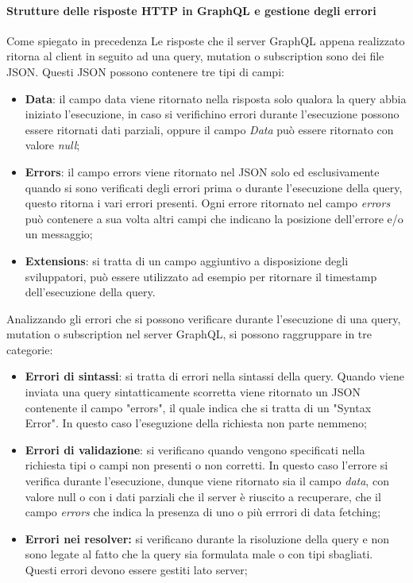 \paragraph{Strutture delle risposte HTTP in GraphQL e gestione degli errori}
Come spiegato in precedenza
Le risposte che il server GraphQL appena realizzato ritorna al client in seguito ad una query, mutation o subscription sono dei file JSON. Questi JSON possono contenere tre tipi di campi:
\begin{itemize}
  \item \textbf{Data}: il campo data viene ritornato nella risposta solo qualora la query abbia iniziato l'esecuzione, in caso si verifichino errori durante l'esecuzione possono essere ritornati dati parziali, oppure il campo \textit{Data} può essere ritornato con valore \textit{null};
  \item \textbf{Errors}: il campo errors viene ritornato nel JSON solo ed esclusivamente quando si sono verificati degli errori prima o durante l'esecuzione della query, questo ritorna i vari errori presenti. Ogni errore ritornato nel campo \textit{errors} può contenere a sua volta altri campi che indicano la posizione dell'errore e/o un messaggio;
  \item \textbf{Extensions}: si tratta di un campo aggiuntivo a disposizione degli sviluppatori, può essere utilizzato ad esempio per ritornare il timestamp dell'esecuzione della query.
\end{itemize}
Analizzando gli errori che si possono verificare durante l'esecuzione di una query, mutation o subscription nel server GraphQL, si possono raggruppare in tre categorie:
\begin{itemize}
  \item \textbf{Errori di sintassi}: si tratta di errori nella sintassi della query. Quando viene inviata una query sintatticamente scorretta viene ritornato un JSON contenente il campo "errors", il quale indica che si tratta di un "Syntax Error". In questo caso l'eseguzione della richiesta non parte nemmeno;
  \item \textbf{Errori di validazione}: si verificano quando vengono specificati nella richiesta tipi o campi non presenti o non corretti. In questo caso l'errore si verifica durante l'esecuzione, dunque viene ritornato sia il campo \textit{data}, con valore null o con i dati parziali che il server è riuscito a recuperare, che il campo \textit{errors} che indica la presenza di uno o più errrori di data fetching;
  \item \textbf{Errori nei resolver:} si verificano durante la risoluzione della query e non sono legate al fatto che la query sia formulata male o con tipi sbagliati. Questi errori devono essere gestiti lato server;
\end{itemize}
